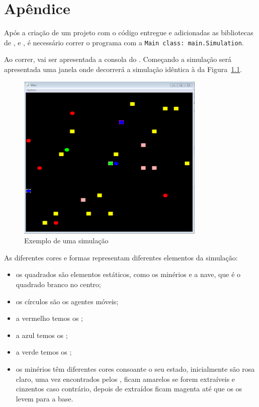 \documentclass[12pt]{report}
\begin{document}
\chapter{Apêndice}

Após a criação de um projeto \java com o código entregue e adicionadas as bibliotecas de \sajas, \jade e \repast, é necessário correr o programa com a \texttt{Main class: main.Simulation}.

Ao correr, vai ser apresentada a consola do \repast. Começando a simulação será apresentada uma janela onde decorrerá a simulação idêntica à da Figura~\ref{simulacao}.

\begin{figure}[h]
	\centering
	\includegraphics[width=0.8\textwidth]{simulacao}
	\caption{Exemplo de uma simulação}
	\label{simulacao}
\end{figure}

As diferentes cores e formas representam diferentes elementos da simulação:
\begin{itemize}
	\item os quadrados são elementos estáticos, como os minérios e a nave, que é o quadrado branco no centro;
	\item os círculos são os agentes móveis;
	\item a vermelho temos os \spotters;
	\item a azul temos os \producers;
	\item a verde temos os \transporters;
	\item os minérios têm diferentes cores consoante o seu estado, inicialmente são rosa claro, uma vez encontrados pelos \spotters, ficam amarelos se forem extraíveis e cinzentos caso contrário, depois de extraídos ficam magenta até que os \transporters os levem para a base.
\end{itemize}
\end{document}
